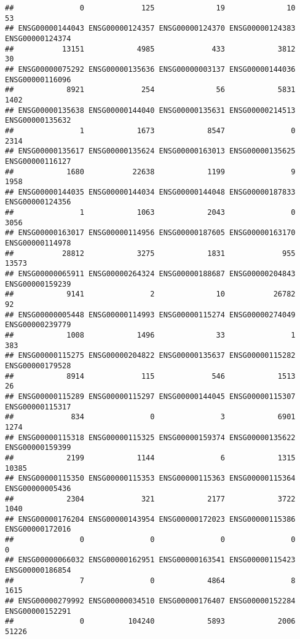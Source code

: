 \documentclass[
]{article}
\begin{document}
\begin{verbatim}
##               0             125              19              10              53 
## ENSG00000144043 ENSG00000124357 ENSG00000124370 ENSG00000124383 ENSG00000124374 
##           13151            4985             433            3812              30 
## ENSG00000075292 ENSG00000135636 ENSG00000003137 ENSG00000144036 ENSG00000116096 
##            8921             254              56            5831            1402 
## ENSG00000135638 ENSG00000144040 ENSG00000135631 ENSG00000214513 ENSG00000135632 
##               1            1673            8547               0            2314 
## ENSG00000135617 ENSG00000135624 ENSG00000163013 ENSG00000135625 ENSG00000116127 
##            1680           22638            1199               9            1958 
## ENSG00000144035 ENSG00000144034 ENSG00000144048 ENSG00000187833 ENSG00000124356 
##               1            1063            2043               0            3056 
## ENSG00000163017 ENSG00000114956 ENSG00000187605 ENSG00000163170 ENSG00000114978 
##           28812            3275            1831             955           13573 
## ENSG00000065911 ENSG00000264324 ENSG00000188687 ENSG00000204843 ENSG00000159239 
##            9141               2              10           26782              92 
## ENSG00000005448 ENSG00000114993 ENSG00000115274 ENSG00000274049 ENSG00000239779 
##            1008            1496              33               1             383 
## ENSG00000115275 ENSG00000204822 ENSG00000135637 ENSG00000115282 ENSG00000179528 
##            8914             115             546            1513              26 
## ENSG00000115289 ENSG00000115297 ENSG00000144045 ENSG00000115307 ENSG00000115317 
##             834               0               3            6901            1274 
## ENSG00000115318 ENSG00000115325 ENSG00000159374 ENSG00000135622 ENSG00000159399 
##            2199            1144               6            1315           10385 
## ENSG00000115350 ENSG00000115353 ENSG00000115363 ENSG00000115364 ENSG00000005436 
##            2304             321            2177            3722            1040 
## ENSG00000176204 ENSG00000143954 ENSG00000172023 ENSG00000115386 ENSG00000172016 
##               0               0               0               0               0 
## ENSG00000066032 ENSG00000162951 ENSG00000163541 ENSG00000115423 ENSG00000186854 
##               7               0            4864               8            1615 
## ENSG00000279992 ENSG00000034510 ENSG00000176407 ENSG00000152284 ENSG00000152291 
##               0          104240            5893            2006           51226 

\end{verbatim}
\end{document}
